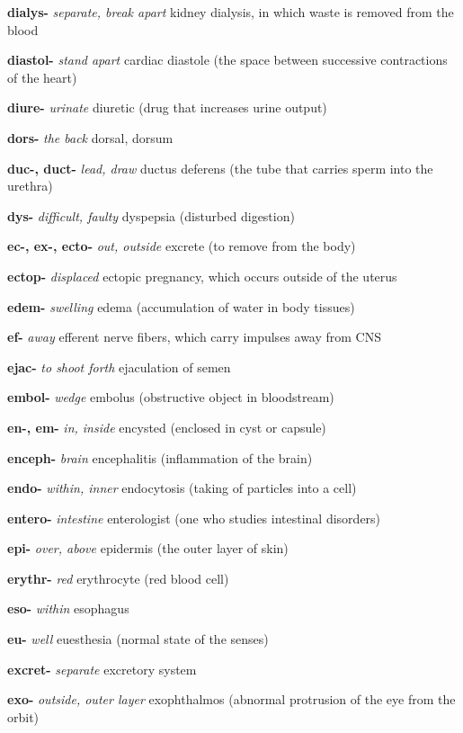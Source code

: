 \documentclass[10pt]{article}
\begin{document}
\begin{multicols}{2}
\begin{hangparas}{10pt}{1}
 \textbf{dialys-} \textit{separate, break apart} kidney dialysis, in which waste is removed from the blood \par
 \textbf{diastol-} \textit{stand apart} cardiac diastole (the space between successive contractions of the heart) \par
 \textbf{diure-} \textit{urinate} diuretic (drug that increases urine output) \par
 \textbf{dors-} \textit{the back} dorsal, dorsum \par
 \textbf{duc-, duct-} \textit{lead, draw} ductus deferens (the tube that carries sperm into the urethra) \par
 \textbf{dys-} \textit{difficult, faulty} dyspepsia (disturbed digestion) \par
 \textbf{ec-, ex-, ecto-} \textit{out, outside} excrete (to remove from the body) \par
 \textbf{ectop-} \textit{displaced} ectopic pregnancy, which occurs outside of the uterus \par
 \textbf{edem-} \textit{swelling} edema (accumulation of water in body tissues) \par
 \textbf{ef-} \textit{away} efferent nerve fibers, which carry impulses away from CNS \par
 \textbf{ejac-} \textit{to shoot forth} ejaculation of semen \par
 \textbf{embol-} \textit{wedge} embolus (obstructive object in bloodstream) \par
 \textbf{en-, em-} \textit{in, inside} encysted (enclosed in cyst or capsule) \par
 \textbf{enceph-} \textit{brain} encephalitis (inflammation of the brain) \par
 \textbf{endo-} \textit{within, inner} endocytosis (taking of particles into a cell) \par
 \textbf{entero-} \textit{intestine} enterologist (one who studies intestinal disorders) \par
 \textbf{epi-} \textit{over, above} epidermis (the outer layer of skin) \par
 \textbf{erythr-} \textit{red} erythrocyte (red blood cell) \par
 \textbf{eso-} \textit{within} esophagus \par
 \textbf{eu-} \textit{well} euesthesia (normal state of the senses) \par
 \textbf{excret-} \textit{separate} excretory system \par
 \textbf{exo-} \textit{outside, outer layer} exophthalmos (abnormal protrusion of the eye from the orbit) \par

\end{hangparas}
\end{multicols}
\end{document}
